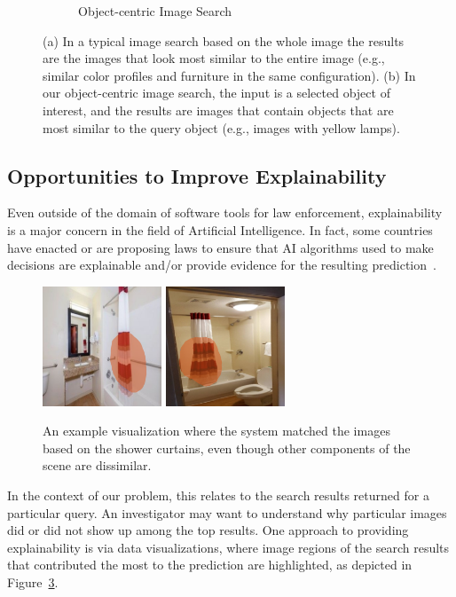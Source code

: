 \documentclass[12pt]{article}
\begin{document}
\begin{figure}
\begin{subfigure}[b]{3.2in}
\begin{subfigure}[b]{2.1in}
        \end{subfigure}
        \caption{Object-centric Image Search}
        \label{fig:objectCentric}
    \end{subfigure}
    \caption[Whole image search vs. object-centric search]{(a) In a typical image search based on the whole image the results are the images that look most similar to the entire image (e.g., similar color profiles and furniture in the same configuration). (b) In our object-centric image search, the input is a selected object of interest, and the results are images that contain objects that are most similar to the query object (e.g., images with yellow lamps).}
    \label{fig:wholeImVsObjectCentric}
\end{figure}

\subsection{Opportunities to Improve Explainability}
Even outside of the domain of software tools for law enforcement, explainability is a major concern in the field of Artificial Intelligence. In fact, some countries have enacted or are proposing laws to ensure that AI algorithms used to make decisions are explainable and/or provide evidence for the resulting prediction~\cite{eu_regulations}.
\begin{figure}
\centering
\includegraphics[width=1.4in]{vis/vis_im1}
\includegraphics[width=1.4in]{vis/vis_im2}
\caption[Example of object matching search]{An example visualization where the system matched the images based on the shower curtains, even though other components of the scene are dissimilar.}
\label{fig:exampleObjHighlighting}
\end{figure}
In the context of our problem, this relates to the search results returned for a particular query. An investigator may want to understand why particular images did or did not show up among the top results. One approach to providing explainability is via data visualizations, where image regions of the search results that contributed the most to the prediction are highlighted, as depicted in Figure~\ref{fig:exampleObjHighlighting}.
\end{document}

